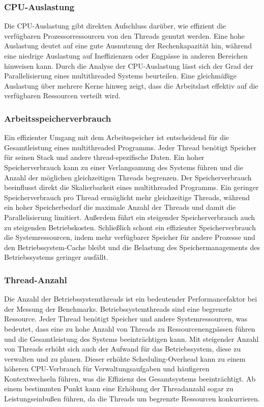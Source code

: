 \documentclass[fontsize=12pt,paper=a4,twoside=semi,parskip=half-,headsepline,headinclude]{scrreprt}
\begin{document}
\subsubsection{CPU-Auslastung}

Die CPU-Auslastung gibt direkten Aufschluss darüber, wie effizient die verfügbaren Prozessorressourcen von den Threads genutzt werden. Eine hohe Auslastung deutet auf eine gute Ausnutzung der Rechenkapazität hin, während eine niedrige Auslastung auf Ineffizienzen oder Engpässe in anderen Bereichen hinweisen kann. Durch die Analyse der CPU-Auslastung lässt sich der Grad der Parallelisierung eines multithreaded Systems beurteilen. Eine gleichmäßige Auslastung über mehrere Kerne hinweg zeigt, dass die Arbeitslast effektiv auf die verfügbaren Ressourcen verteilt wird.

\subsubsection{Arbeitsspeicherverbrauch}

Ein effizienter Umgang mit dem Arbeitsspeicher ist entscheidend für die Gesamtleistung eines multithreaded Programms. Jeder Thread benötigt Speicher für seinen Stack und andere thread-spezifische Daten. Ein hoher Speicherverbrauch kann zu einer Verlangsamung des Systems führen und die Anzahl der möglichen gleichzeitigen Threads begrenzen. Der Speicherverbrauch beeinflusst direkt die Skalierbarkeit eines multithreaded Programms. Ein geringer Speicherverbrauch pro Thread ermöglicht mehr gleichzeitige Threads, während ein hoher Speicherbedarf die maximale Anzahl der Threads und damit die Parallelisierung limitiert.  Außerdem führt ein steigender Speicherverbrauch auch zu steigenden Betriebskosten. Schließlich schont ein effizienter Speicherverbrauch die Systemressourcen, indem mehr verfügbarer Speicher für andere Prozesse und den Betriebssystem-Cache bleibt und die Belastung des Speichermanagements des Betriebssystems geringer ausfällt.

\subsubsection{Thread-Anzahl}

Die Anzahl der Betriebssystemthreads ist ein bedeutender Performancefaktor bei der Messung der Benchmarks. Betriebssystemthreads sind eine begrenzte Ressource. Jeder Thread benötigt Speicher und andere Systemressourcen, was bedeutet, dass eine zu hohe Anzahl von Threads zu Ressourcenengpässen führen und die Gesamtleistung des Systems beeinträchtigen kann. Mit steigender Anzahl von Threads erhöht sich auch der Aufwand für das Betriebssystem, diese zu verwalten und zu planen. Dieser erhöhte Scheduling-Overhead kann zu einem höheren CPU-Verbrauch für Verwaltungsaufgaben und häufigeren Kontextwechseln führen, was die Effizienz des Gesamtsystems beeinträchtigt. Ab einem bestimmten Punkt kann eine Erhöhung der Threadanzahl sogar zu Leistungseinbußen führen, da die Threads um begrenzte Ressourcen konkurrieren.
\end{document}
